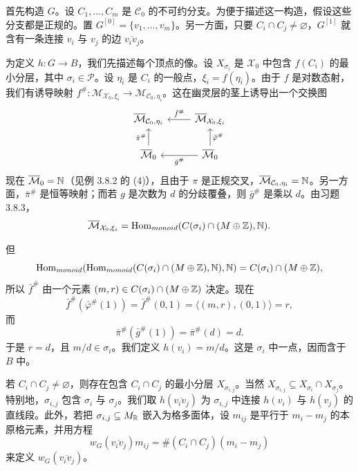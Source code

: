 首先构造 $G$。设 $C_1,\dots,C_m$ 是 $\mathcal C_0$ 的不可约分支。为便于描述这一构造，假设这些分支都是正规的。置 $G^{[0]}=\{v_1,\dots,v_m\}$。另一方面，只要 $C_i\cap C_j\ne\varnothing$，$G^{[1]}$ 就含有一条连接 $v_i$ 与 $v_j$ 的边 $\overline{v_iv_j}$。

为定义 $h:G\to B$，我们先描述每个顶点的像。设 $X_{\sigma_i}$ 是 $\mathcal X_0$ 中包含 $f(C_i)$ 的最小分层，其中 $\sigma_i\in\mathcal P$。设 $\eta_i$ 是 $C_i$ 的一般点，$\xi_i=f(\eta_i)$。由于 $f$ 是对数态射，我们有诱导映射 $f^\#:\mathcal M_{\mathcal X_0,\xi_i}\to\mathcal M_{\mathcal C_0,\eta_i}$。这在幽灵层的茎上诱导出一个交换图
\[
\begin{tikzcd}
\overline{\mathcal M}_{\mathcal C_0,\eta_i} & \overline{\mathcal M}_{\mathcal X_0,\xi_i} \arrow[l, "\bar f^\#"']\\
\overline{\mathcal M}_0 \arrow[u, "\bar\pi^\#"] & \overline{\mathcal M}_0 \arrow[l, "\bar g^\#"] \arrow[u, "\bar\varphi^\#"']
\end{tikzcd}
\]
现在 $\overline{\mathcal M}_0=\mathbb{N}$（见例 3.8.2 的 (4)），且由于 $\pi$ 是正规交叉，$\overline{\mathcal M}_{\mathcal C_0,\eta_i}=\mathbb{N}$。另一方面，$\bar\pi^\#$ 是恒等映射；而若 $g$ 是次数为 $d$ 的分歧覆叠，则 $\bar g^\#$ 是乘以 $d$。由习题 3.8.3，
\[
\overline{\mathcal M}_{\mathcal X_0,\xi_i}=\operatorname{Hom}_{monoid}(C(\sigma_i)\cap(M\oplus\mathbb{Z}),\mathbb{N}).
\]

但
\[
\operatorname{Hom}_{monoid}(\operatorname{Hom}_{monoid}(C(\sigma_i)\cap(M\oplus\mathbb{Z}),\mathbb{N}),\mathbb{N})=C(\sigma_i)\cap(M\oplus\mathbb{Z}),
\]
所以 $\bar f^\#$ 由一个元素 $(m,r)\in C(\sigma_i)\cap(M\oplus\mathbb{Z})$ 决定。现在
\[
\bar f^\#(\bar\varphi^\#(1))=\bar f^\#(0,1)=\langle(m,r),(0,1)\rangle=r,
\]
而
\[
\bar\pi^\#(\bar g^\#(1))=\bar\pi^\#(d)=d.
\]
于是 $r=d$，且 $m/d\in\sigma_i$。我们定义 $h(v_i)=m/d$。这是 $\sigma_i$ 中一点，因而含于 $B$ 中。

若 $C_i\cap C_j\ne\varnothing$，则存在包含 $C_i\cap C_j$ 的最小分层 $X_{\sigma_{i,j}}$。当然 $X_{\sigma_{i,j}}\subseteq X_{\sigma_i}\cap X_{\sigma_j}$。特别地，$\sigma_{i,j}$ 包含 $\sigma_i$ 与 $\sigma_j$。我们取 $h(\overline{v_iv_j})$ 为 $\sigma_{i,j}$ 中连接 $h(v_i)$ 与 $h(v_j)$ 的直线段。此外，若把 $\sigma_{i,j}\subseteq M_{\mathbb{R}}$ 嵌入为格多面体，设 $m_{ij}$ 是平行于 $m_i-m_j$ 的本原格元素，并用方程
\[
w_G(\overline{v_iv_j})m_{ij}=\#(C_i\cap C_j)(m_i-m_j)
\]
来定义 $w_G(\overline{v_iv_j})$。

